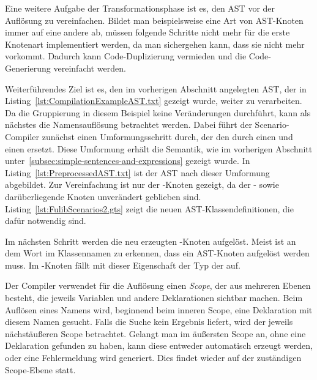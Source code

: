 Eine weitere Aufgabe der Transformationsphase ist es, den AST vor der Auflösung zu vereinfachen.
Bildet man beispielsweise eine Art von AST-Knoten immer auf eine andere ab, müssen folgende Schritte nicht mehr für die erste Knotenart implementiert werden, da man sichergehen kann, dass sie nicht mehr vorkommt.
Dadurch kann Code-Duplizierung vermieden und die Code-Generierung vereinfacht werden.

Weiterführendes Ziel ist es, den im vorherigen Abschnitt angelegten AST, der in Listing~\ref{lst:CompilationExampleAST.txt} gezeigt wurde, weiter zu verarbeiten.
Da die Gruppierung in diesem Beispiel keine Veränderungen durchführt, kann als nächstes die Namensauflösung betrachtet werden.
Dabei führt der Scenario-Compiler zunächst einen Umformungsschritt durch, der den  durch einen  und einen  ersetzt.
Diese Umformung erhält die Semantik, wie im vorherigen Abschnitt unter~\ref{subsec:simple-sentences-and-expressions} gezeigt wurde.
In Listing~\ref{lst:PreprocessedAST.txt} ist der AST nach dieser Umformung abgebildet.
Zur Vereinfachung ist nur der -Knoten gezeigt, da der - sowie darüberliegende Knoten unverändert geblieben sind.
Listing~\ref{lst:FulibScenarios2.gts} zeigt die neuen AST-Klassendefinitionen, die dafür notwendig sind.



Im nächsten Schritt werden die neu erzeugten -Knoten aufgelöst.
Meist ist an dem Wort  im Klassennamen zu erkennen, dass ein AST-Knoten aufgelöst werden muss.
Im -Knoten fällt mit dieser Eigenschaft der Typ der  auf.

Der Compiler verwendet für die Auflösung einen \emph{Scope}, der aus mehreren Ebenen besteht, die jeweils Variablen und andere Deklarationen sichtbar machen.
Beim Auflösen eines Namens wird, beginnend beim inneren Scope, eine Deklaration mit diesem Namen gesucht.
Falls die Suche kein Ergebnis liefert, wird der jeweils nächstäußeren Scope betrachtet.
Gelangt man im äußersten Scope an, ohne eine Deklaration gefunden zu haben, kann diese entweder automatisch erzeugt werden, oder eine Fehlermeldung wird generiert.
Dies findet wieder auf der zuständigen Scope-Ebene statt.

